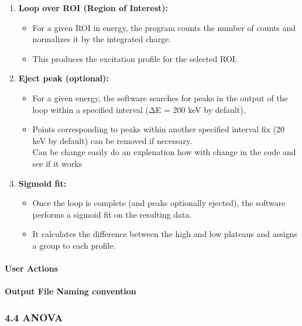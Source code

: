 \begin{enumerate}
\def\labelenumi{\arabic{enumi}.}
\tightlist
\item
  \textbf{Loop over ROI (Region of Interest):}

  \begin{itemize}
  \tightlist
  \item
    For a given ROI in energy, the program counts the number of counts
    and normalizes it by the integrated charge.\\
  \item
    This produces the excitation profile for the selected ROI.
  \end{itemize}
\item
  \textbf{Eject peak (optional):}

  \begin{itemize}
  \tightlist
  \item
    For a given energy, the software searches for peaks in the output of
    the loop within a specified interval (ΔE = 200 keV by default).\\
  \item
    Points corresponding to peaks within another specified interval fix
    (20 keV by default) can be removed if necessary.\\
    {Can be change easily do an explenation how with change in the code
    and see if it works}
  \end{itemize}
\item
  \textbf{Sigmoid fit:}

  \begin{itemize}
  \tightlist
  \item
    Once the loop is complete (and peaks optionally ejected), the
    software performs a sigmoid fit on the resulting data.\\
  \item
    It calculates the difference between the high and low plateaus and
    assigns a group to each profile.
  \end{itemize}
\end{enumerate}

\hypertarget{user-actions-2}{%
\paragraph{User Actions}\label{user-actions-2}}

\hypertarget{output-file-naming-convention-1}{%
\paragraph{Output File Naming
convention}\label{output-file-naming-convention-1}}

\hypertarget{anova}{%
\subsubsection{4.4 ANOVA}\label{anova}}
